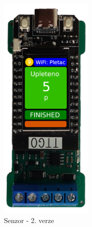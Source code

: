 \begin{figure}[htbp]
    \centering
    \includegraphics[width=0.4\textwidth]{img/V2-deska-esp-screen.png}
    \caption{Senzor - 2. verze}
    \label{fig:SenzorV2}
\end{figure}


\newpage
